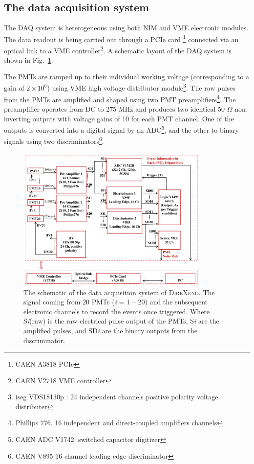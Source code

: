 \subsection{The data acquisition system }
\label{sec:DAQ}



The DAQ system is heterogeneous using both 
NIM and VME electronic modules. The data readout is being carried out through a PCIe card \footnote{CAEN A3818 PCIe}  connected via an optical link to a VME controller\footnote{CAEN V2718 VME controller}. A schematic layout of the DAQ system is shown in Fig.~{\ref{Fig:DAQscheme}}. 

The PMTs are ramped up to their individual working voltage (corresponding to a gain of $2\times10^6$) using VME high voltage distributor module\footnote{iseg VDS18130p : 
24 independent channels positive polarity voltage distributer}. The raw pulses from the PMTs are amplified and shaped using 
two PMT preamplifiers\footnote{Phillips 776. 16 independent and direct-coupled amplifiers channels}. The preamplifier operates 
from DC to 275 MHz and produces two identical 50 $\Omega$ non inverting outputs with voltage gains of 10 for each PMT channel. One 
of the outputs is converted into a digital signal by an ADC\footnote{CAEN ADC V1742: switched capacitor digitizer}, and the other to 
binary signals using two discriminators\footnote{CAEN V895 16 channel leading edge discriminator}.

\begin{figure}[h]
   \centering
   \includegraphics[width=0.85\textwidth]{DAQscheme.pdf}
   \caption{The schematic of the data acquisition system of \textsc{DireXeno}. The 			signal coming from 20 PMTs ({\it i} = 1 -- 20) and the subsequent electronic channels to record the events once triggered. Where S{\it i}(raw) is the raw electrical pulse output of the PMTs, S{\it i} are the amplified pulses, and SD{\it i} are the binary outputs from the discriminator.
}
   \label{Fig:DAQscheme}
\end{figure}


